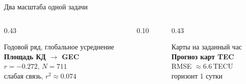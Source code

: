 \documentclass[aspectratio=169,11pt]{beamer}
\begin{document}
\begin{frame}[t]{Два масштаба одной задачи}
\begin{columns}[T,onlytextwidth]
\begin{column}[T]{0.43\textwidth}
  \begin{beamercolorbox}[wd=\linewidth,sep=4mm,rounded=true]{}
    {\footnotesize\color{muted}Годовой ряд, глобальное усреднение}\\[1.5mm]
    {\bfseries Площадь КД $\rightarrow$ GEC}\\[2mm]
    {\large $r=-0.272$, $N=711$}\\[1mm]
    {\footnotesize\color{muted}слабая связь, $r^2\approx 0.074$}
  \end{beamercolorbox}
\end{column}
\begin{column}[T]{0.10\textwidth}
  \centering
\end{column}
\begin{column}[T]{0.43\textwidth}
  \begin{beamercolorbox}[wd=\linewidth,sep=4mm,rounded=true]{}
    {\footnotesize\color{muted}Карты на заданный час}\\[1.5mm]
    {\bfseries Прогноз карт TEC}\\[2mm]
    {\large RMSE $\approx 6.6$\,TECU}\\[1mm]
    {\footnotesize\color{muted}горизонт 1 сутки}
  \end{beamercolorbox}
\end{column}
\end{columns}

\vfill
\begin{center}
\end{center}
\end{frame}
\end{document}
